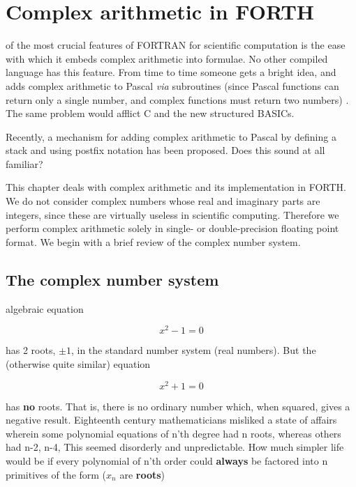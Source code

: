 
\chapter{Complex arithmetic in FORTH}

 of the most crucial features of FORTRAN for scientific computation is the ease with which it embeds complex arithmetic into formulae. No other compiled language has this feature. From time to time someone gets a bright idea, and adds complex arithmetic to Pascal \textit{via} subroutines (since Pascal functions can return only a single number, and complex functions must return two numbers) . The same problem would afflict C and the new structured BASICs.

Recently, a mechanism for adding complex arithmetic to Pascal by defining a stack and using postfix notation has been proposed. Does this sound at all familiar?

This chapter deals with complex arithmetic and its implementation in FORTH. We do not consider complex numbers whose real and imaginary parts are integers, since these are virtually useless in scientific computing. Therefore we perform complex arithmetic solely in single- or double-precision floating point format. We begin with a brief review of the complex number system.

\section{The complex number system}
 algebraic equation

\begin{equation}
  x^2 - 1 = 0
\end{equation}

has 2 roots, $\pm1$, in the standard number system (real numbers). But the (otherwise quite similar) equation

\begin{equation}
  x^2 + 1 = 0
\end{equation}

has \textbf{no} roots. That is, there is no ordinary number which, when squared, gives a negative result. Eighteenth century mathematicians misliked a state of affairs wherein some polynomial equations of n'th degree had n roots, whereas others had n-2, n-4, \etc This seemed disorderly and unpredictable. How much simpler life would be if every polynomial of n'th order could \textbf{always} be factored into n primitives of the form ($x_n$ are \textbf{roots})

